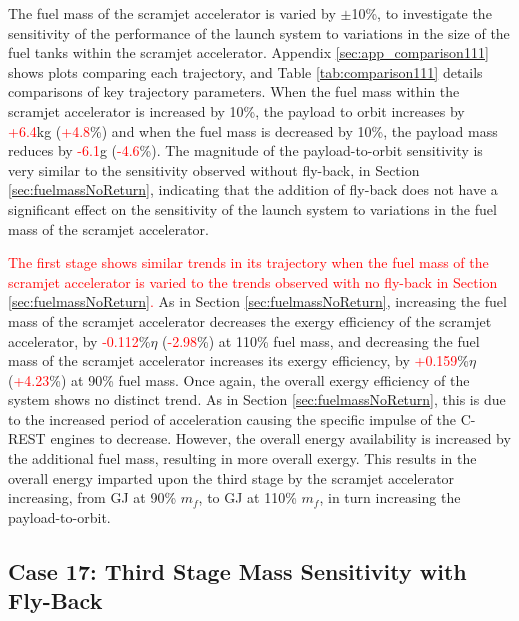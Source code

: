 The fuel mass of the scramjet accelerator is varied by $\pm$10\%, to investigate the sensitivity of the performance of the launch system to variations in the size of the fuel tanks within the scramjet accelerator. 
Appendix \ref{sec:app_comparison111} shows plots comparing each trajectory, and Table \ref{tab:comparison111} details comparisons of key trajectory parameters. 
When the fuel mass within the scramjet accelerator is increased by 10\%, the payload to orbit increases by \textcolor{red}{+6.4}kg (\textcolor{red}{+4.8}\%) and when the fuel mass is decreased by 10\%, the payload mass reduces by \textcolor{red}{-6.1}g (\textcolor{red}{-4.6}\%). The magnitude of the payload-to-orbit sensitivity is very similar to the sensitivity observed without fly-back, in Section \ref{sec:fuelmassNoReturn}, indicating that the addition of fly-back does not have a significant effect on the sensitivity of the launch system to variations in the fuel mass of the scramjet accelerator. 


\textcolor{red}{
The first stage shows similar trends in its trajectory when the fuel mass of the scramjet accelerator is varied to the trends observed with no fly-back in Section \ref{sec:fuelmassNoReturn}.}
As in Section \ref{sec:fuelmassNoReturn}, increasing the fuel mass of the scramjet accelerator decreases the exergy efficiency of the scramjet accelerator, by \textcolor{red}{-0.112}\%$\eta$ (\textcolor{red}{-2.98}\%) at 110\% fuel mass, and decreasing the fuel mass of the scramjet accelerator increases its exergy efficiency, by \textcolor{red}{+0.159}\%$\eta$ (\textcolor{red}{+4.23}\%) at 90\% fuel mass. Once again, the overall exergy efficiency of the system shows no distinct trend. 
As in Section \ref{sec:fuelmassNoReturn}, this is due to the increased period of acceleration causing the specific impulse of the C-REST engines to decrease. However, the overall energy availability is increased by the additional fuel mass, resulting in more overall exergy. This results in the overall energy imparted upon the third stage by the scramjet accelerator increasing, from \secondExergythirdStagemFuelNinety GJ at 90\% $m_{f}$, to \secondExergythirdStagemFuelOneHundredTen GJ at 110\% $m_{f}$, in turn increasing the payload-to-orbit.




\subsection{Case 17: Third Stage Mass Sensitivity with Fly-Back}

